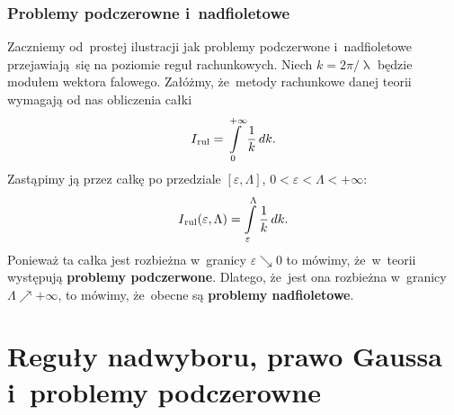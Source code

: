 \documentclass[10pt,t]{beamer}
\renewcommand{\lambda}{\uplambda}
\begin{document}
\begin{frame}[label=sld-Problemy-podczerwone-i-nadfioletowe]
  \frametitle{Problemy podczerowne i~nadfioletowe}


  Zaczniemy od~prostej ilustracji jak problemy podczerwone i~nadfioletowe
  przejawiają~się na poziomie reguł rachunkowych. Niech $k = 2 \pi / \lambda$
  będzie modułem wektora falowego. Załóżmy, że~metody rachunkowe danej
  teorii wymagają od nas obliczenia całki
  \begin{equation}
    \label{eq:Problemy-podczerwone-i-nadfioletowe-01}
    I_{ \hspace{0.05em} \text{rul} } = \int\limits_{ 0 }^{ +\infty } \frac{ 1 }{ k } \, dk.
  \end{equation}
  Zastąpimy ją przez całkę po przedziale $[ \varepsilon, \Lambda ]$, $0 < \varepsilon < \Lambda < +\infty$:
  \begin{equation}
    \label{eq:Problemy-podczerwone-i-nadfioletowe-02}
    I_{ \hspace{0.05em} \text{rul} }( \varepsilon, \Lambda ) =
    \int\limits_{ \varepsilon }^{ \Lambda } \frac{ 1 }{ k } \, dk.
  \end{equation}
  Ponieważ ta całka jest rozbieżna w~granicy $\varepsilon \searrow 0$ to mówimy,
  że~w~teorii występują \textbf{problemy podczerwone}. Dlatego, że~jest ona
  rozbieżna w~granicy $\Lambda \nearrow +\infty$, to mówimy, że~obecne są
  \textbf{problemy nadfioletowe}.

\end{frame}










\section{Reguły nadwyboru, prawo Gaussa i~problemy podczerowne}
\end{document}
